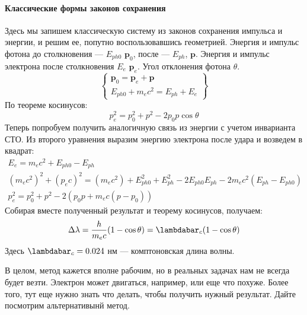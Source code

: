\documentclass[12pt]{article}
\begin{document}
\paragraph{Классические формы законов сохранения}
Здесь мы запишем классическую систему из законов сохранения импульса и энергии, и решим ее, попутно воспользовавшись геометрией. Энергия и импульс фотона до столкновения --- $E_{ph0}$ $\textbf{p}_0$, после --- $E_{ph}$, $\textbf{p}$. Энергия и импульс электрона после столкновения $E_e$ $\textbf{p}_e$. Угол отклонения фотона $\theta$.
\begin{equation*}
    \left\{ 
    \begin{matrix}
        \textbf{p}_0 = \textbf{p}_e + \textbf{p}\\
        E_{ph0} + m_ec^2 = E_{ph} + E_e
    \end{matrix}
    \right\}
\end{equation*}
По теореме косинусов: 
\begin{equation*}
    p_e^2 = p_0^2 +p^2 - 2p_0p\cos{\theta}
\end{equation*}
Теперь попробуем получить аналогичную связь  из энергии с учетом инварианта СТО. Из второго уравнения выразим энергию электрона после удара и возведем в квадрат:
\begin{gather*}
    E_e = m_ec^2 + E_{ph0} - E_{ph}\\
    (m_ec^2)^2 + (p_ec)^2 = (m_ec^2) + E^2_{ph0} + E^2_{ph} - 2E_{ph0}E_{ph} - 2 m_ec^2(E_{ph} - E_{ph0})\\
    p_e^2 = p_0^2 +p^2 - 2(p_0p+m_ec(p-p_0))
\end{gather*}
Собирая вместе полученный результат и теорему косинусов, получаем:
\begin{equation}
\label{eq:sem_02_kompton}
    \Delta\lambda = \dfrac{h}{m_ec}(1-\cos{\theta}) = \lambdabar_c(1-\cos{\theta})
\end{equation}
Здесь $\lambdabar_c = 0.024$ нм --- комптоновская длина волны.

\vspace{1em} \noindent
В целом, метод кажется вполне рабочим, но в реальных задачах нам не всегда будет везти. Электрон может двигаться, например, или еще что похуже. Более того, тут еще нужно знать что делать, чтобы получить нужный результат. Дайте посмотрим альтернативынй метод.
\end{document}
